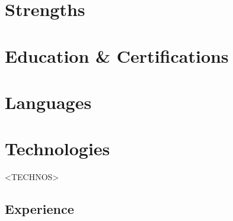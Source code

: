 \documentclass[a4paper,11pt]{article}
\begin{document}
  \setcolumnwidth{50mm, 11.6cm}
  \setlength{\columnsep}{4mm}
  \begin{paracol}{2}
    \begin{tcolorbox}[blanker, breakable, width=\linewidth]

        \section{Strengths}
        
        \section{Education \& Certifications}
        
        \section{Languages}

        \section{Technologies}<TECHNOS>

    \end{tcolorbox}
    \switchcolumn
    \begin{tcolorbox}[blanker, breakable, width=\linewidth]

        \section{Experience}
        
    \end{tcolorbox}
  \end{paracol}
\end{document}
